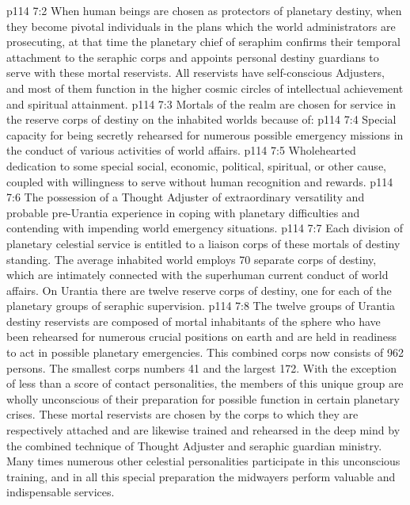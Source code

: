 \vs p114 7:2 When human beings are chosen as protectors of planetary destiny, when they become pivotal individuals in the plans which the world administrators are prosecuting, at that time the planetary chief of seraphim confirms their temporal attachment to the seraphic corps and appoints personal destiny guardians to serve with these mortal reservists. All reservists have self\hyp{}conscious Adjusters, and most of them function in the higher cosmic circles of intellectual achievement and spiritual attainment.
\vs p114 7:3 Mortals of the realm are chosen for service in the reserve corps of destiny on the inhabited worlds because of:
\vs p114 7:4 \bibnobreakspace Special capacity for being secretly rehearsed for numerous possible emergency missions in the conduct of various activities of world affairs.
\vs p114 7:5 \bibnobreakspace Wholehearted dedication to some special social, economic, political, spiritual, or other cause, coupled with willingness to serve without human recognition and rewards.
\vs p114 7:6 \bibnobreakspace The possession of a Thought Adjuster of extraordinary versatility and probable pre\hyp{}Urantia experience in coping with planetary difficulties and contending with impending world emergency situations.
\vs p114 7:7 \pc Each division of planetary celestial service is entitled to a liaison corps of these mortals of destiny standing. The average inhabited world employs 70 separate corps of destiny, which are intimately connected with the superhuman current conduct of world affairs. On Urantia there are twelve reserve corps of destiny, one for each of the planetary groups of seraphic supervision.
\vs p114 7:8 The twelve groups of Urantia destiny reservists are composed of mortal inhabitants of the sphere who have been rehearsed for numerous crucial positions on earth and are held in readiness to act in possible planetary emergencies. This combined corps now consists of 962 persons. The smallest corps numbers 41 and the largest 172. With the exception of less than a score of contact personalities, the members of this unique group are wholly unconscious of their preparation for possible function in certain planetary crises. These mortal reservists are chosen by the corps to which they are respectively attached and are likewise trained and rehearsed in the deep mind by the combined technique of Thought Adjuster and seraphic guardian ministry. Many times numerous other celestial personalities participate in this unconscious training, and in all this special preparation the midwayers perform valuable and indispensable services.
